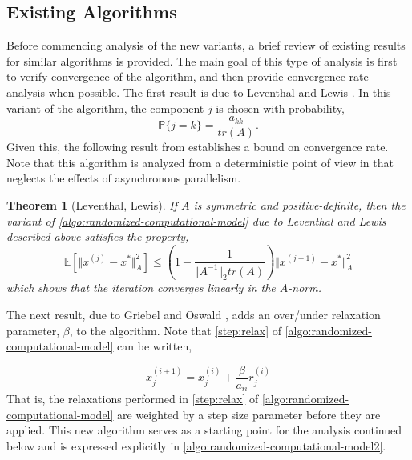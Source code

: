 \documentclass{article}
\newtheorem{theorem}{Theorem}
\theoremstyle{definition}
\theoremstyle{example}
\theoremstyle{example}
\theoremstyle{example}
\begin{document}
\subsection{Existing Algorithms}
\label{sect:existing-algorithms}

Before commencing analysis of the new variants, a brief review of existing results for similar algorithms is provided. The main goal of this type of analysis is first to verify convergence of the algorithm, and then provide convergence rate analysis when possible. The first result is due to Leventhal and Lewis \cite{leventhal2010randomized}. In this variant of the algorithm, the component $j$ is chosen with probability,
	\begin{equation}
		\mathbb{P}\{j = k\} = \frac{a_{kk}}{tr(A)}.
	\end{equation}
\noindent
Given this, the following result from \cite{leventhal2010randomized} establishes a bound on convergence rate. Note that this algorithm is analyzed from a deterministic point of view in \cite{leventhal2010randomized} that neglects the effects of asynchronous parallelism.

\begin{theorem}[Leventhal, Lewis]
	If $A$ is symmetric and positive-definite, then the variant of \cref{algo:randomized-computational-model} due to Leventhal and Lewis described above satisfies the property,
		\begin{equation}
			\mathbb{E}[\Vert x^{(j)} - x^* \Vert_A^2] \leq \left(1 - \frac{1}{\Vert A^{-1} \Vert_2 tr(A)}\right) \Vert x^{(j-1)} - x^* \Vert_A^2
		\end{equation}
	which shows that the iteration converges linearly in the $A$-norm.
\end{theorem}

The next result, due to Griebel and Oswald \cite{griebel2012greedy}, adds an over/under relaxation parameter, $\beta$, to the algorithm. Note that \cref{step:relax} of \cref{algo:randomized-computational-model} can be written,

\begin{equation}
	x_j^{(i+1)} = x_j^{(i)} + \frac{\beta}{a_{ii}} r_j^{(i)}
\end{equation}
\noindent
That is, the relaxations performed in \cref{step:relax} of \cref{algo:randomized-computational-model} are weighted by a step size parameter before they are applied. This new algorithm serves as a starting point for the analysis continued below and is expressed explicitly in \cref{algo:randomized-computational-model2}.
\end{document}
